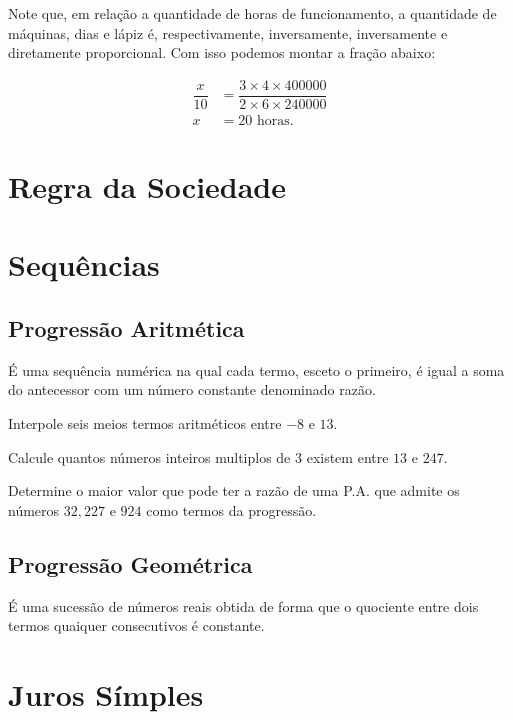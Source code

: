 Note que, em relação a quantidade de horas de funcionamento, a quantidade de máquinas, dias e lápiz é, respectivamente, inversamente, inversamente e diretamente proporcional. Com isso podemos montar a fração abaixo:

\begin{align*}
    \dfrac{x}{10}&=\dfrac{3 \times 4 \times 400000}{2 \times 6 \times 240000}\\
    x&=20 \mbox{ horas}.
\end{align*}

\section{Regra da Sociedade}

\section{Sequências}
\subsection{Progressão Aritmética}
É uma sequência numérica na qual cada termo, esceto o primeiro, é igual a soma do antecessor com um número constante denominado razão.

\begin{exe}
Interpole seis meios termos aritméticos entre $-8$ e $13$.
\end{exe}

\begin{exe}
Calcule quantos números inteiros multiplos de $3$ existem entre $13$ e $247$.
\end{exe}

\begin{exe}
Determine o maior valor que pode ter a razão de uma P.A. que admite os números $32, 227$ e $924$ como termos da progressão.
\end{exe}

\subsection{Progressão Geométrica}
É uma sucessão de números reais obtida de forma que o quociente entre dois termos quaiquer consecutivos é constante.

\section{Juros Símples}

